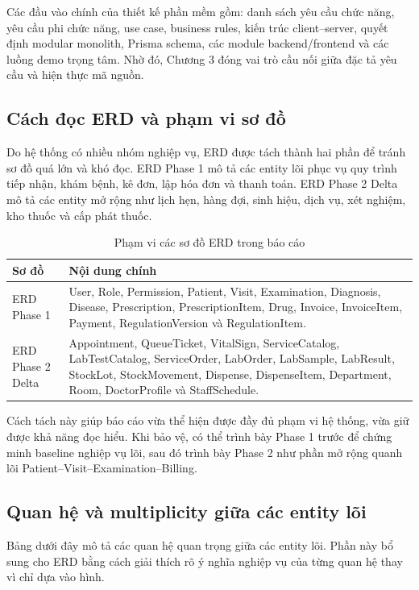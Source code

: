 \noindent
Các đầu vào chính của thiết kế phần mềm gồm: danh sách yêu cầu chức năng, yêu cầu phi chức năng, use case, business rules, kiến trúc client--server, quyết định modular monolith, Prisma schema, các module backend/frontend và các luồng demo trọng tâm. Nhờ đó, Chương 3 đóng vai trò cầu nối giữa đặc tả yêu cầu và hiện thực mã nguồn.

\subsection{Cách đọc ERD và phạm vi sơ đồ}

Do hệ thống có nhiều nhóm nghiệp vụ, ERD được tách thành hai phần để tránh sơ đồ quá lớn và khó đọc. ERD Phase 1 mô tả các entity lõi phục vụ quy trình tiếp nhận, khám bệnh, kê đơn, lập hóa đơn và thanh toán. ERD Phase 2 Delta mô tả các entity mở rộng như lịch hẹn, hàng đợi, sinh hiệu, dịch vụ, xét nghiệm, kho thuốc và cấp phát thuốc.

\begin{table}[H]
\centering
\caption{Phạm vi các sơ đồ ERD trong báo cáo}
\begin{tabularx}{\textwidth}{|p{4cm}|X|}
\hline
\textbf{Sơ đồ} & \textbf{Nội dung chính} \\
\hline
ERD Phase 1 & User, Role, Permission, Patient, Visit, Examination, Diagnosis, Disease, Prescription, PrescriptionItem, Drug, Invoice, InvoiceItem, Payment, RegulationVersion và RegulationItem. \\
\hline
ERD Phase 2 Delta & Appointment, QueueTicket, VitalSign, ServiceCatalog, LabTestCatalog, ServiceOrder, LabOrder, LabSample, LabResult, StockLot, StockMovement, Dispense, DispenseItem, Department, Room, DoctorProfile và StaffSchedule. \\
\hline
\end{tabularx}
\end{table}

\noindent
Cách tách này giúp báo cáo vừa thể hiện được đầy đủ phạm vi hệ thống, vừa giữ được khả năng đọc hiểu. Khi bảo vệ, có thể trình bày Phase 1 trước để chứng minh baseline nghiệp vụ lõi, sau đó trình bày Phase 2 như phần mở rộng quanh lõi Patient--Visit--Examination--Billing.

\subsection{Quan hệ và multiplicity giữa các entity lõi}

Bảng dưới đây mô tả các quan hệ quan trọng giữa các entity lõi. Phần này bổ sung cho ERD bằng cách giải thích rõ ý nghĩa nghiệp vụ của từng quan hệ thay vì chỉ dựa vào hình.

